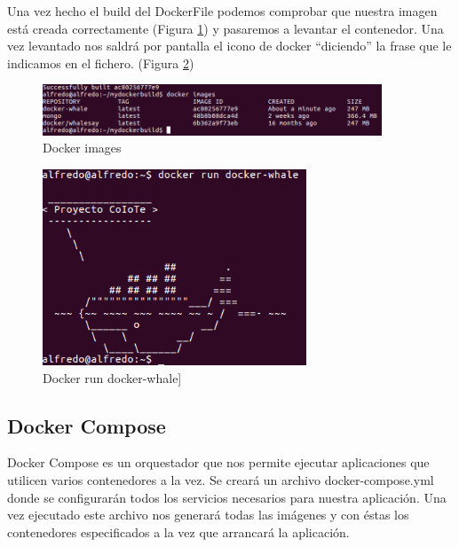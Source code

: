 Una vez hecho el build del DockerFile podemos comprobar que nuestra imagen está creada correctamente (Figura \ref{Imag:ImageWhale}) y pasaremos a levantar el contenedor. Una vez levantado nos saldrá por pantalla el icono de docker “diciendo” la frase que le indicamos en el fichero. (Figura \ref{Run:RunWhale}) 

\begin{figure}[htb]
\begin{center}
\includegraphics[width=0.90\textwidth]{./setup/DockerImagesWhale}
\caption{Docker images}
\label{Imag:ImageWhale}
\end{center}
\end{figure}
\pagebreak

\begin{figure}[htb]
\begin{center}
\includegraphics[width=0.70\textwidth]{./setup/DockerRunWhale}
\caption{Docker run docker-whale]}
\label{Run:RunWhale}
\end{center}
\end{figure}

\subsection{Docker Compose}

Docker Compose es un orquestador que nos permite ejecutar aplicaciones que utilicen varios contenedores a la vez. Se creará un archivo docker-compose.yml donde se configurarán todos los servicios necesarios para nuestra aplicación. Una vez ejecutado este archivo nos generará todas las imágenes y con éstas los contenedores especificados a la vez que arrancará la aplicación.

